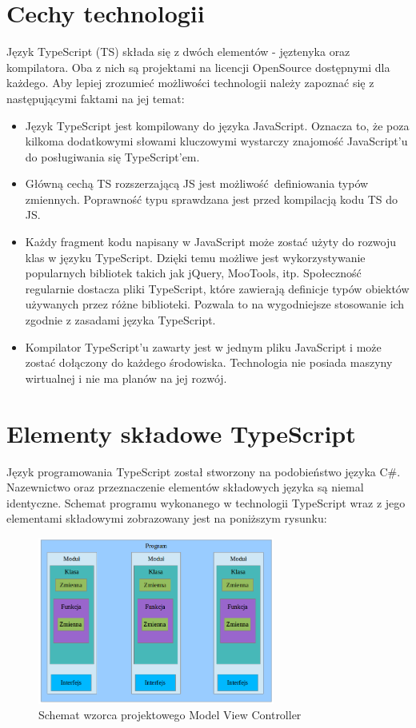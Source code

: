 \section{Cechy technologii}
Język TypeScript (TS) składa się z dwóch elementów - jęztenyka oraz kompilatora. Oba z nich są projektami na licencji OpenSource dostępnymi dla każdego. Aby lepiej zrozumieć możliwości technologii należy zapoznać się z następującymi faktami na jej temat:
\begin{itemize}
\item Język TypeScript jest kompilowany do języka JavaScript. Oznacza to, że poza kilkoma dodatkowymi słowami kluczowymi wystarczy znajomość JavaScript'u do posługiwania się TypeScript'em. 
\item Główną cechą TS rozszerzającą JS jest możliwość definiowania typów zmiennych. Poprawność typu sprawdzana jest przed kompilacją kodu TS do JS.
\item Każdy fragment kodu napisany w JavaScript może zostać użyty do rozwoju klas w języku TypeScript. Dzięki temu możliwe jest wykorzystywanie popularnych bibliotek takich jak jQuery, MooTools, itp. Społeczność regularnie dostacza pliki TypeScript, które zawierają definicje typów obiektów używanych przez różne biblioteki. Pozwala  to na wygodniejsze stosowanie ich zgodnie z zasadami języka TypeScript. 
\item Kompilator TypeScript'u zawarty jest w jednym pliku JavaScript i może zostać dołączony do każdego środowiska. Technologia nie posiada maszyny wirtualnej i nie ma planów na jej rozwój.
\end{itemize}

\section {Elementy składowe TypeScript}
Język programowania TypeScript został stworzony na podobieństwo języka C\#. Nazewnictwo oraz przeznaczenie elementów składowych języka są niemal identyczne.
Schemat programu wykonanego w technologii TypeScript wraz z jego elementami składowymi zobrazowany jest na poniższym rysunku:
\begin{figure}[h]
	\includegraphics[height=55mm]{./img/typescript-program.png}
	\caption{Schemat wzorca projektowego Model View Controller}
	\label{fig:mvc-scheme}
\end{figure}

